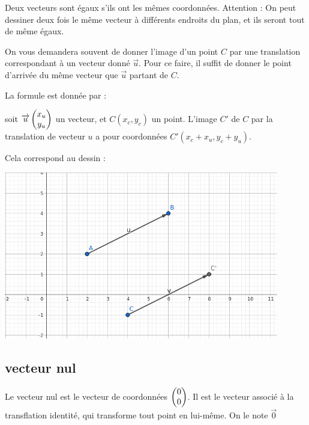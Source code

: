 \documentclass[10pt,a4paper,oneside]{book}
\begin{document}
\begin{de}
    Deux vecteurs sont égaux s'ils ont les mêmes coordonnées. Attention : On peut dessiner deux fois le même vecteur à différents endroits du plan, et ils seront tout de même égaux.
\end{de}

On vous demandera souvent de donner l'image d'un point $C$ par une translation correspondant à un vecteur donné $\overrightarrow{u}$. Pour ce faire, il suffit de donner le point d'arrivée du même vecteur que $\overrightarrow{u}$ partant de $C$.


\begin{minipage}{0.5\textwidth}

La formule est donnée par :

soit $\overrightarrow{u}  \begin{pmatrix} x_u\\ y_u \end{pmatrix}$ un vecteur, et $C(x_c,y_c)$ un point. L'image $C'$ de $C$ par la translation de vecteur $u$ a pour coordonnées $C'(x_c+x_u, y_c+ y_u)$.

\end{minipage}
\begin{minipage}{0.45\textwidth}
  Cela correspond au dessin :

    \centering
    \includegraphics[width=0.9\textwidth]{Vecteurs_C+u.png} 
\end{minipage}



\subsection{vecteur nul}

\begin{de}
    Le vecteur nul est le vecteur de coordonnées $ \begin{pmatrix} 0\\ 0 \end{pmatrix}$. Il est le vecteur associé à la transflation identité, qui transforme tout point en lui-même. On le note $\overrightarrow{0}$
\end{de}
\end{document}
